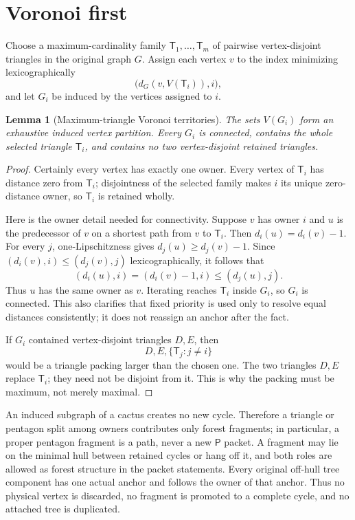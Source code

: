 \documentclass[11pt]{article}
\newtheorem{lemma}[theorem]{Lemma}
\theoremstyle{remark}
\newcommand{\T}{\mathsf T}
\newcommand{\Pp}{\mathsf P}
\begin{document}
\section{Voronoi first}\label{sec:voronoi}

Choose a maximum-cardinality family
$\T_1,\ldots,\T_m$ of pairwise vertex-disjoint triangles in the original
graph $G$.  Assign each vertex $v$ to the index minimizing lexicographically
\[
 \bigl(d_G(v,V(\T_i)),i\bigr),                              \tag{2.1}
\]
and let $G_i$ be induced by the vertices assigned to $i$.

\begin{lemma}[Maximum-triangle Voronoi territories]\label{lem:voronoi}
The sets $V(G_i)$ form an exhaustive induced vertex partition.  Every $G_i$
is connected, contains the whole selected triangle $\T_i$, and contains no
two vertex-disjoint retained triangles.
\end{lemma}

\begin{proof}
Certainly every vertex has exactly one owner.  Every vertex of $\T_i$ has
distance zero from $\T_i$; disjointness of the selected family makes $i$ its
unique zero-distance owner, so $\T_i$ is retained wholly.

Here is the owner detail needed for connectivity.  Suppose $v$ has owner $i$
and $u$ is the predecessor of $v$ on a shortest path from $v$ to $\T_i$.
Then $d_i(u)=d_i(v)-1$.  For every $j$, one-Lipschitzness gives
$d_j(u)\geq d_j(v)-1$.  Since $(d_i(v),i)\leq(d_j(v),j)$ lexicographically,
it follows that
\[
 (d_i(u),i)=(d_i(v)-1,i)\leq(d_j(u),j).
\]
Thus $u$ has the same owner as $v$.  Iterating reaches $\T_i$ inside $G_i$,
so $G_i$ is connected.  This also clarifies that fixed priority is used only
to resolve equal distances consistently; it does not reassign an anchor after
the fact.

If $G_i$ contained vertex-disjoint triangles $D,E$, then
\[
 D,E,\{\T_j:j\ne i\}
\]
would be a triangle packing larger than the chosen one.  The two triangles
$D,E$ replace $\T_i$; they need not be disjoint from it.  This is why the
packing must be maximum, not merely maximal.
\end{proof}

An induced subgraph of a cactus creates no new cycle.  Therefore a triangle or
pentagon split among owners contributes only forest fragments; in particular,
a proper pentagon fragment is a path, never a new $\Pp$ packet.  A fragment may
lie on the minimal hull between retained cycles or hang off it, and both roles
are allowed as forest structure in the packet statements.  Every original
off-hull tree component has one actual anchor and follows the owner of that
anchor.  Thus no physical vertex is discarded, no fragment is promoted to a
complete cycle, and no attached tree is duplicated.
\end{document}
